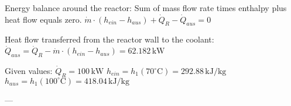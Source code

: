 Energy balance around the reactor:  
Sum of mass flow rate times enthalpy plus heat flow equals zero.  
\( \dot{m} \cdot (h_{ein} - h_{aus}) + \dot{Q}_R - \dot{Q}_{aus} = 0 \)  

Heat flow transferred from the reactor wall to the coolant:  
\( \dot{Q}_{aus} = \dot{Q}_R - \dot{m} \cdot (h_{ein} - h_{aus}) = 62.182 \, \text{kW} \)  

Given values:  
\( \dot{Q}_R = 100 \, \text{kW} \)  
\( h_{ein} = h_1(70^\circ \text{C}) = 292.88 \, \text{kJ/kg} \)  
\( h_{aus} = h_1(100^\circ \text{C}) = 418.04 \, \text{kJ/kg} \)  

---